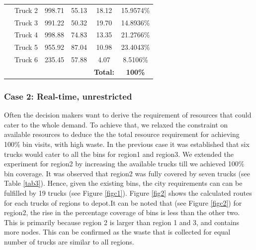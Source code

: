 \documentclass[12pt]{article}
\begin{document}
\begin{table}[H]
\begin{tabular}{|c|c|c|c|c|c|}
        \cline{2-6}& Truck 2 & 998.71 & 55.13 & 18.12 & 15.9574\%\\        
        \cline{2-6}& Truck 3 & 991.22 & 50.32 & 19.70 & 14.8936\%\\        
        \cline{2-6}& Truck 4 & 998.88 & 74.83 & 13.35 & 21.2766\%\\      
        \cline{2-6}& Truck 5 & 955.92 & 87.04 & 10.98 & 23.4043\%\\      
        \cline{2-6}& Truck 6 & 235.45 & 57.88 & 4.07 & 8.5106\%\\
        \hline & & & &\textbf{Total:} &\textbf{100\%}\\
        \hline      
    \end{tabular}
\end{table}

\subsubsection*{Case 2: Real-time, unrestricted}

Often the decision makers want to derive the requirement of resources that could cater to the whole demand. To achieve that, we relaxed the constraint on available resources to deduce the the total resource requirement for achieving 100\% bin visits, with high waste. In the previous case it was established that six trucks would cater to all the bins for region1 and region3. We extended the experiment for region2 by increasing the available trucks till we achieved 100\% bin coverage. It was observed that region2 was fully covered by seven trucks (see Table \ref{tab3}). Hence, given the existing bins, the city requirements can can be  fulfilled by 19 trucks (see Figure \ref{figc1}). Figure \ref{fig2} shows the calculated routes for each trucks of regions to depot.It can be noted that (see Figure \ref{figc2}) for region2, the rise in the percentage coverage of bins is less than the other two. This is primarily because region 2 is larger than region 1 and 3, and contains more nodes. This can be confirmed as the waste that is collected for equal number of trucks are similar to all regions. 
\end{document}
